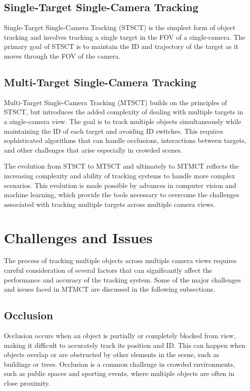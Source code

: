 \subsection{Single-Target Single-Camera Tracking}\label{subsec:st_sct}
Single-Target Single-Camera Tracking (STSCT) is the simplest form of object tracking and involves tracking a single target in the FOV of a single-camera. The primary goal of STSCT is to maintain the ID and trajectory of the target as it moves through the FOV of the camera.

\subsection{Multi-Target Single-Camera Tracking}\label{subsec:mt_sct}
Multi-Target Single-Camera Tracking (MTSCT) builds on the principles of STSCT, but introduces the added complexity of dealing with multiple targets in a single-camera view. The goal is to track multiple objects simultaneously while maintaining the ID of each target and avoiding ID switches. This requires sophisticated algorithms that can handle occlusions, interactions between targets, and other challenges that arise especially in crowded scenes.

The evolution from STSCT to MTSCT and ultimately to MTMCT reflects the increasing complexity and ability of tracking systems to handle more complex scenarios. This evolution is made possible by advances in computer vision and machine learning, which provide the tools necessary to overcome the challenges associated with tracking multiple targets across multiple camera views.

\section{Challenges and Issues}\label{sec:challenges_and_issues}
The process of tracking multiple objects across multiple camera views requires careful consideration of several factors that can significantly affect the performance and accuracy of the tracking system. Some of the major challenges and issues faced in MTMCT are discussed in the following subsections.

\subsection{Occlusion}\label{subsec:occlusion}
Occlusion occurs when an object is partially or completely blocked from view, making it difficult to accurately track its position and ID. This can happen when objects overlap or are obstructed by other elements in the scene, such as buildings or trees. Occlusion is a common challenge in crowded environments, such as public spaces and sporting events, where multiple objects are often in close proximity.

